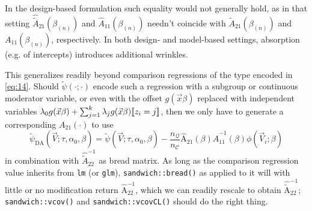\documentclass{article}
\DeclarePairedDelimiter{\indicator}{\llbracket}{\rrbracket}
\begin{document}
In the design-based formulation such equality would not generally
hold, as in that setting
$\hat{\tilde{A}}_{21}(\beta_{(n)})$ and $\hat{A}_{11}(\beta_{(n)})$ needn't
coincide with $\tilde{A}_{21}(\beta_{(n)})$ and ${A}_{11}(\beta_{(n)})$, respectively.  In both design- and model-based settings, absorption (e.g. of intercepts) introduces additional wrinkles.

This generalizes readily beyond comparison regressions of the type encoded in \eqref{eq:14}. Should $\tilde{\psi}(\cdot; \cdot)$ encode such a regression with a subgroup or continuous moderator variable, or even with the offset $g(\vec{x}\beta)$ replaced with independent variables $\lambda_{0}g(\vec{x}\beta) + \sum_{j=1}^{k}\lambda_{j} g(\vec{x}\beta)\indicator{z_{i}=j}$, then we only have to generate a corresponding ${A}_{21}(\cdot)$ to use
\begin{equation*}\label{eq:24}
      \tilde{\psi}_\text{DA}(\vec{V}; \tau, \alpha_{0},
    \beta) = \tilde{\psi} (\vec{V}; \tau,\alpha_{0},
    \beta) -
    \frac{n_{\mathcal{Q}}}{n_{\mathcal{C}}}
    \hat{\mathrm{A}}_{21}(\beta) \hat{A}_{11}^{-1}(\beta)\phi(\vec{V}_{i};
    \beta)
\end{equation*}
in combination with $\hat{\tilde{A}}_{22}^{-1}$ as bread matrix. As long as the comparison regression value inherits from \texttt{lm} (or \texttt{glm}), \texttt{sandwich::bread()} as applied to it will with little or no modification return
$\hat{\mathrm{A}}_{22}^{-1}$, which we can readily rescale to obtain $\hat{\tilde{\mathrm{A}}}_{22}^{-1}$; \texttt{sandwich::vcov()} and \texttt{sandwich::vcovCL()} should do the right thing.
\end{document}
